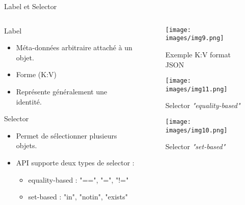 \documentclass{bredelebeamer}
\begin{document}




\begin{frame}{Label et Selector}
\begin{columns}
\begin{column}{0.5\textwidth}
\begin{block}{Label}
\begin{itemize}
\item Méta-données arbitraire attaché à un objet.
\item Forme (K:V)
\item Représente généralement une identité.
\end{itemize}
\end{block}
\begin{block}{Selector}
\begin{itemize}
\item Permet de sélectionner plusieurs objets.
\item API supporte deux types de selector : 
\begin{itemize}
\item equality-based : "==", "=", "!=" %
\item set-based : "in", "notin", "exists"
\end{itemize}
\end{itemize}
\end{block}
\end{column}
\begin{column}{0.5\textwidth}
\begin{figure}
\centering
\texttt{[image: images/img9.png]}
\caption{Exemple K:V format JSON}
\end{figure}
\begin{figure}
\centering
\texttt{[image: images/img11.png]}
\caption{Selector \textit{"equality-based"}}
\end{figure}
\begin{figure}
\centering
\texttt{[image: images/img10.png]}
\caption{Selector \textit{"set-based"}}
\end{figure}
\end{column}
\end{columns}
\end{frame}
\end{document}
